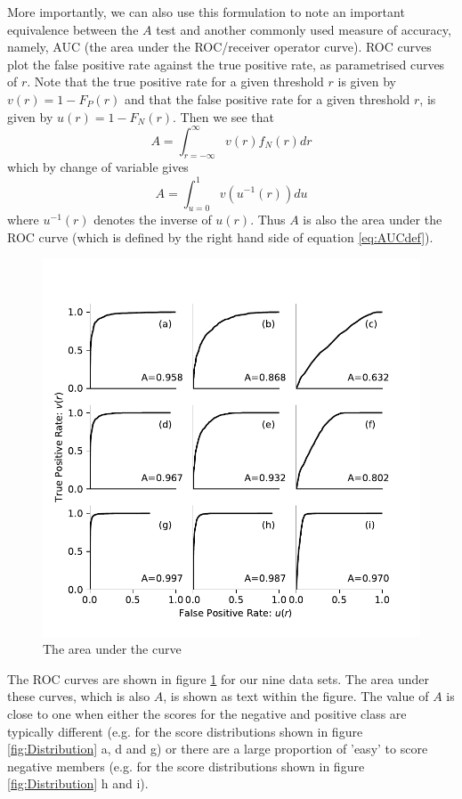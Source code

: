 \documentclass{article}
\begin{document}
More importantly, we can also use this formulation to note an important equivalence between the $A$ test and another commonly used measure of accuracy, namely, AUC (the area under the ROC/receiver operator curve). ROC curves plot the false positive rate against the true positive rate, as parametrised curves of $r$. Note that the true positive rate for a given threshold $r$ is given by $v(r)=1-F_P(r)$ and that the false positive rate for a given threshold $r$, is given by $u(r)=1-F_N(r)$. Then we see that
\[
A  =  \int_{r=-\infty}^{\infty} v(r) f_N(r) dr  
\]
which by change of variable gives
\begin{equation}
A  = \int_{u=0}^{1} v \left( u^{-1}(r) \right) du  \label{eq:AUCdef}
\end{equation}
where $u^{-1}(r)$ denotes the inverse of $u(r)$. Thus $A$ is also the area under the ROC curve (which is defined by the right hand side of equation \ref{eq:AUCdef}).

\begin{figure}[t]
\centering
\includegraphics[scale=1]{AUC.pdf}
\caption{The area under the curve} \label{fig:AUC}
\end{figure}

The ROC curves are shown in figure \ref{fig:AUC} for our nine data sets. The area under these curves, which is also $A$, is shown as text within the figure. The value of $A$ is close to one when either the scores for the negative and positive class are typically different (e.g. for the score distributions shown in figure \ref{fig:Distribution} a, d and g) or there are a large proportion of 'easy' to score negative members (e.g. for the score distributions shown in figure \ref{fig:Distribution} h and i). 
\end{document}
